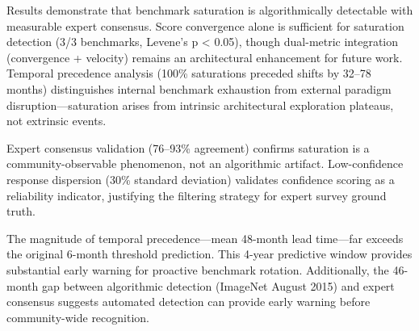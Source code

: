 
Results demonstrate that benchmark saturation is algorithmically detectable with measurable expert consensus. Score convergence alone is sufficient for saturation detection (3/3 benchmarks, Levene's p < 0.05), though dual-metric integration (convergence + velocity) remains an architectural enhancement for future work. Temporal precedence analysis (100\% saturations preceded shifts by 32--78 months) distinguishes internal benchmark exhaustion from external paradigm disruption---saturation arises from intrinsic architectural exploration plateaus, not extrinsic events.

Expert consensus validation (76--93\% agreement) confirms saturation is a community-observable phenomenon, not an algorithmic artifact. Low-confidence response dispersion (30\% standard deviation) validates confidence scoring as a reliability indicator, justifying the filtering strategy for expert survey ground truth.

The magnitude of temporal precedence---mean 48-month lead time---far exceeds the original 6-month threshold prediction. This 4-year predictive window provides substantial early warning for proactive benchmark rotation. Additionally, the 46-month gap between algorithmic detection (ImageNet August 2015) and expert consensus \citep{June2019} suggests automated detection can provide early warning before community-wide recognition.
